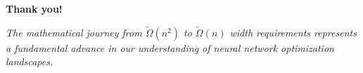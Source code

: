 \begin{frame}
  \begin{center}
    \textbf{Thank you!}
    
    \vspace{1em}
    
    \textit{The mathematical journey from $\tilde{\Omega}(n^2)$ to $\tilde{\Omega}(n)$ width requirements represents a fundamental advance in our understanding of neural network optimization landscapes.}
  \end{center}
\end{frame}

